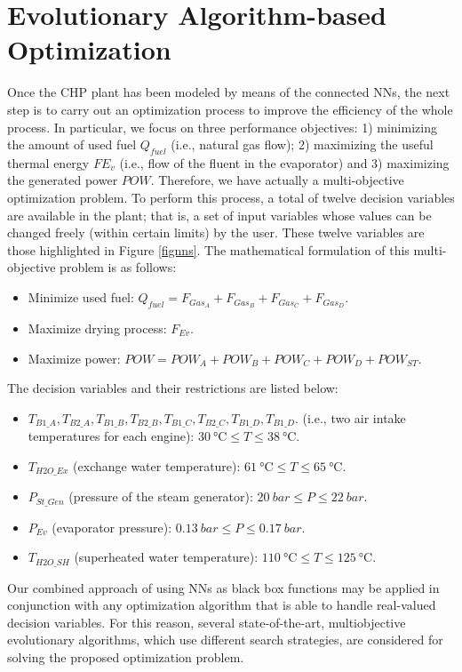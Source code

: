 \section{Evolutionary Algorithm-based Optimization}
\label{sec:optimization}
Once the CHP plant has been modeled by means of the connected NNs, the next step is to  carry out an optimization process to improve the efficiency of the whole process. In particular, we focus on three performance objectives: 1) minimizing the amount of used fuel $Q_{fuel}$ (i.e., natural gas flow); 2) maximizing the useful thermal energy $FE_v$ (i.e., flow of the fluent in the evaporator) and 3) maximizing the generated power $POW$. Therefore, we have actually a multi-objective optimization problem. To perform this process, a total of twelve decision variables  are available in the plant; that is, a set of input variables whose values can be changed freely (within certain limits) by the user. These twelve variables are those highlighted in Figure  \ref{fignns}. The mathematical formulation of this multi-objective problem is as follows:
%
\begin{itemize}[-]
	\item Minimize used fuel: $Q_{fuel} = F_{Gas_A} + F_{Gas_B} + F_{Gas_C} + F_{Gas_D}$.
	\item Maximize drying process: $F_{Ev}$.
	\item Maximize power: $POW = POW_A + POW_B + POW_C + POW_D + POW_{ST}$.
\end{itemize}
%
The decision variables and their restrictions are listed below:
%
\begin{itemize}[-]
	\item $T_{B1\_A}, T_{B2\_A}, T_{B1\_B}, T_{B2\_B}, T_{B1\_C}, T_{B2\_C}, T_{B1\_D}, T_{B1\_D}$. (i.e., two air intake temperatures for each engine): $\SI{30}{\celsius} \leq T  \leq  \SI{38}{\celsius}$.
	\item $T_{H2O\_Ex}$ (exchange water temperature): $\SI{61}{\celsius}  \leq T  \leq  \SI{65}{\celsius}$.
	\item $P_{St\_Gen}$ (pressure of the steam generator): $\SI{20}{bar}  \leq  P  \leq  \SI{22}{bar}$.
	\item $P_{Ev}$ (evaporator pressure): $\SI{0.13}{bar}  \leq  P  \leq  \SI{0.17}{bar}$.
	\item $T_{H2O\_SH}$ (superheated water temperature): $\SI{110}{\celsius}  \leq  T  \leq  \SI{125}{\celsius}$.
\end{itemize}

Our combined approach of using NNs as black box functions may be applied in conjunction with any optimization algorithm that is able to handle real-valued decision variables. For this reason, several state-of-the-art, multiobjective evolutionary algorithms, which use different search strategies, are considered for solving the proposed optimization problem.


